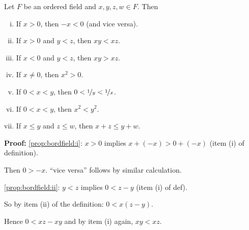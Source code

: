 \documentclass[10pt,aspectratio=169]{beamer}
\begin{document}
\begin{frame}

\begin{proposition}
Let $F$ be an ordered field and $x,y,z,w \in F$.  Then
\begin{enumerate}[(i)]
\pause
\item \label{prop:bordfield:i} If $x > 0$, then $-x < 0$ (and vice versa).
\pause
\item \label{prop:bordfield:ii} If $x > 0$ and $y < z$, then $xy < xz$.
\pause
\item \label{prop:bordfield:iii} If $x < 0$ and $y < z$, then $xy > xz$.
\pause
\item \label{prop:bordfield:iv} If $x \not= 0$, then $x^2 > 0$.
\pause
\quad{}
\pause
\item \label{prop:bordfield:v} If $0 < x < y$, then $0 < \nicefrac{1}{y} < \nicefrac{1}{x}$.
\pause
\item \label{prop:bordfield:vi} If $0 < x < y$, then $x^2 < y^2$.
\pause
\item \label{prop:bordfield:vii} If $x \leq y$ and $z \leq w$, then $x + z \leq y + w$.
\end{enumerate}
\end{proposition}

\pause

\textbf{Proof:}
\eqref{prop:bordfield:i}:  $x > 0$ implies $x + (-x) > 0 + (-x)$
(item (i) of definition).
\pause

Then $0 > -x$. 
\pause
\quad ``vice versa'' follows by similar calculation.

\medskip
\pause

\eqref{prop:bordfield:ii}: $y < z$ implies $0 < z - y$ (item (i) of def).  
\pause

So by item (ii) of the definition: $0 < x(z-y)$.

\pause
Hence $0 < xz - xy$ and by item (i) again, $xy < xz$.

\end{frame}
\end{document}

